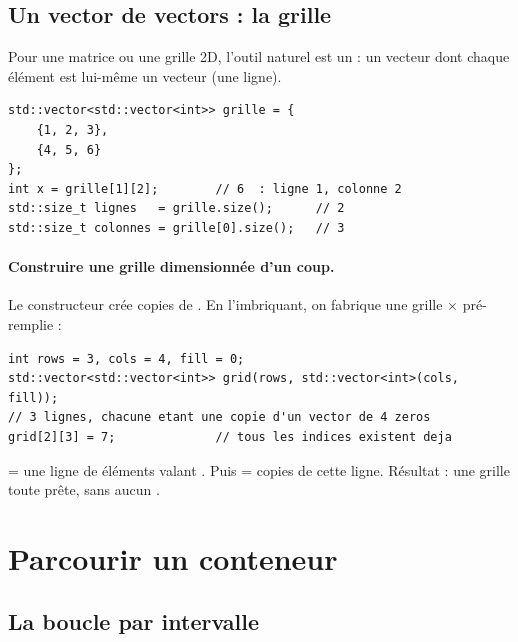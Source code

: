 \documentclass[11pt]{article}
\begin{document}
\subsection*{Un vector de vectors : la grille}

Pour une matrice ou une grille 2D, l'outil naturel est un
 : un vecteur dont chaque élément est
lui-même un vecteur (une ligne).

\begin{lstlisting}
std::vector<std::vector<int>> grille = {
    {1, 2, 3},
    {4, 5, 6}
};
int x = grille[1][2];        // 6  : ligne 1, colonne 2
std::size_t lignes   = grille.size();      // 2
std::size_t colonnes = grille[0].size();   // 3
\end{lstlisting}

\paragraph{Construire une grille dimensionnée d'un coup.} Le constructeur
 crée  copies de .
En l'imbriquant, on fabrique une grille $\times$
pré-remplie :

\begin{lstlisting}
int rows = 3, cols = 4, fill = 0;
std::vector<std::vector<int>> grid(rows, std::vector<int>(cols, fill));
// 3 lignes, chacune etant une copie d'un vector de 4 zeros
grid[2][3] = 7;              // tous les indices existent deja
\end{lstlisting}

\begin{aretenir}
 = une ligne de  éléments valant
. Puis  = 
copies de cette ligne. Résultat : une grille toute prête, sans aucun
.
\end{aretenir}

\section{Parcourir un conteneur}

\subsection*{La boucle  par intervalle}
\end{document}
